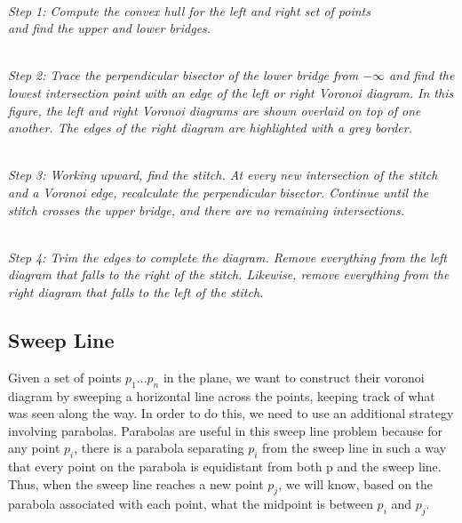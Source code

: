 \begin{center}
 \\
{\em
Step 1: Compute the convex hull for the left and right set of points\\
and find the upper and lower bridges.}
\vfill

 \\
{\em Step 2: Trace the perpendicular bisector of the lower bridge from
$ - \infty$ and find the lowest intersection point with an edge of the
left or right Voronoi diagram.  In this figure, the left and right
Voronoi diagrams are shown overlaid on top of one another.  The edges
of the right diagram are highlighted with a grey border.  }

 \\ {\em
Step 3: Working upward, find the stitch.  At every new intersection of
the stitch and a Voronoi edge, recalculate the perpendicular
bisector.  Continue until the stitch crosses the upper bridge, and
there are no remaining intersections. }
\vfill

 \\
{\em Step 4: Trim the edges to complete the diagram.  Remove
everything from the left diagram that falls to the right of the
stitch.  Likewise, remove everything from the right diagram that falls
to the left of the stitch. }
\end{center}

\subsection{Sweep Line}

Given a set of points $p_1...p_n$ in the plane, we want to construct their 
voronoi diagram by sweeping a horizontal line across the points, keeping track 
of what was seen along the way.  In order to do this, we need to use an 
additional strategy involving parabolas.  Parabolas are useful in this 
sweep line problem because for any point $p_i$, there is a parabola separating 
$p_i$ from the sweep line in such a way that every point on the parabola is 
equidistant from both p and the sweep line.  Thus, when the sweep line reaches
a new point $p_j$, we will know, based on the parabola associated with each point,
what the midpoint is between $p_i$ and $p_j$.


